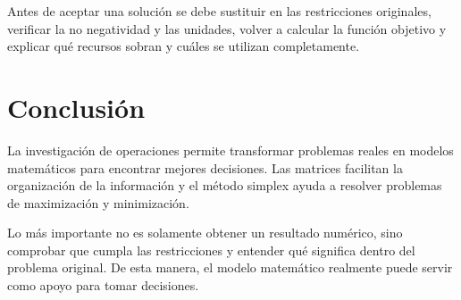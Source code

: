 \documentclass[12pt]{article}
\begin{document}
Antes de aceptar una solución se debe sustituir en las restricciones originales, verificar la no negatividad y las unidades, volver a calcular la función objetivo y explicar qué recursos sobran y cuáles se utilizan completamente.

\section*{Conclusión}
La investigación de operaciones permite transformar problemas reales en modelos matemáticos para encontrar mejores decisiones. Las matrices facilitan la organización de la información y el método simplex ayuda a resolver problemas de maximización y minimización.

Lo más importante no es solamente obtener un resultado numérico, sino comprobar que cumpla las restricciones y entender qué significa dentro del problema original. De esta manera, el modelo matemático realmente puede servir como apoyo para tomar decisiones.
\end{document}
